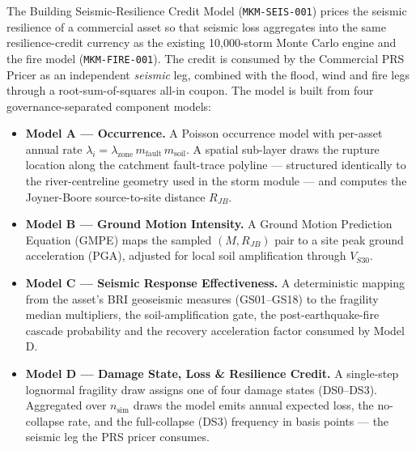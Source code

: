 \documentclass[11pt,a4paper]{article}
\begin{document}
\mkmtitlepage
\mkmlegalpage
\tableofcontents
\clearpage

\mkmexecsummary

The Building Seismic-Resilience Credit Model (\texttt{MKM-SEIS-001}) prices the
seismic resilience of a commercial asset so that seismic loss aggregates into
the same resilience-credit currency as the existing 10{,}000-storm Monte Carlo
engine and the fire model (\texttt{MKM-FIRE-001}). The credit is consumed by the
Commercial PRS Pricer as an independent \emph{seismic} leg, combined with the
flood, wind and fire legs through a root-sum-of-squares all-in coupon. The model
is built from four governance-separated component models:

\begin{itemize}
  \item \textbf{Model A --- Occurrence.} A Poisson occurrence model with
        per-asset annual rate $\lambda_i = \lambda_{\text{zone}}\, m_{\text{fault}}\,
        m_{\text{soil}}$. A spatial sub-layer draws the rupture location along the
        catchment fault-trace polyline --- structured identically to the
        river-centreline geometry used in the storm module --- and computes the
        Joyner-Boore source-to-site distance $R_{JB}$.
  \item \textbf{Model B --- Ground Motion Intensity.} A Ground Motion Prediction
        Equation (GMPE) maps the sampled $(M, R_{JB})$ pair to a site peak ground
        acceleration (PGA), adjusted for local soil amplification through
        $V_{S30}$.
  \item \textbf{Model C --- Seismic Response Effectiveness.} A deterministic
        mapping from the asset's BRI geoseismic measures (GS01--GS18) to the
        fragility median multipliers, the soil-amplification gate, the
        post-earthquake-fire cascade probability and the recovery acceleration
        factor consumed by Model D.
  \item \textbf{Model D --- Damage State, Loss \& Resilience Credit.} A
        single-step lognormal fragility draw assigns one of four damage states
        (DS0--DS3). Aggregated over $n_{\text{sim}}$ draws the model emits annual
        expected loss, the no-collapse rate, and the full-collapse (DS3)
        frequency in basis points --- the seismic leg the PRS pricer consumes.
\end{itemize}
\end{document}
